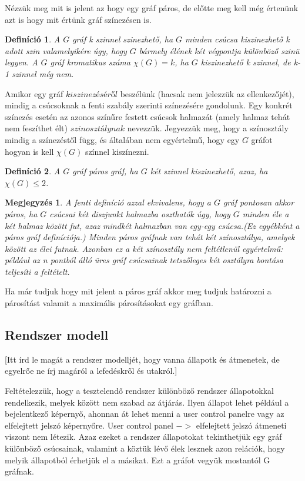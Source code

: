\documentclass[12pt]{article}
\newtheorem{defin}{Definíció}[section]
\newtheorem{megj}{Megjegyzés}[section]
\begin{document}
Nézzük meg mit is jelent az hogy egy gráf páros, de előtte meg kell még értenünk azt is hogy mit értünk gráf színezésen is.

\begin{defin}
A $G$ gráf k szinnel szinezhető, ha $G$ minden csúcsa kiszinezhető k adott szin valamelyikére úgy, hogy $G$ bármely élének két végpontja különböző szinü legyen. A $G$ gráf kromatikus száma $\chi(G) = k$, ha $G$ kiszinezhető k szinnel, de k-1 szinnel még nem. ~\cite{szam:Fleiner}
\end{defin}

Amikor egy gráf $kiszinezéséről$ beszélünk (hacsak nem jelezzük az ellenkezőjét), mindig a csúcsoknak a fenti szabály szerinti színezésére gondolunk. Egy konkrét színezés esetén az azonos színűre festett csúcsok halmazát (amely halmaz tehát nem feszíthet élt) $szinosztálynak$ nevezzük. Jegyezzük meg, hogy a színosztály mindig a színezéstől függ, és általában nem egyértelmű, hogy egy $G$ gráfot hogyan is kell $\chi(G)$ színnel kiszínezni.

\begin{defin}
A $G$ gráf páros gráf, ha $G$ két szinnel kiszinezhető, azaz, ha $\chi(G) \leq 2$. ~\cite{szam:Fleiner}
\end{defin}

\begin{megj}
A fenti definíció azzal ekvivalens, hogy a $G$ gráf pontosan akkor páros, ha $G$ csúcsai két diszjunkt halmazba oszthatók úgy, hogy $G$ minden éle a két halmaz között fut, azaz mindkét halmazban van egy-egy csúcsa.(Ez egyébként a páros gráf definíciója.) Minden páros gráfnak van tehát két színosztálya, amelyek között az élei futnak. Azonban ez a két színosztály nem feltétlenül egyértelmű: például az n pontból álló üres gráf csúcsainak tetszőleges két osztályra bontása teljesíti a feltételt.
\end{megj}

Ha már tudjuk hogy mit jelent a páros gráf akkor meg tudjuk határozni a párosítást valamit a maximális párosításokat egy gráfban.

\subsection{Rendszer modell}
[Itt írd le magát a rendszer modelljét, hogy vanna állapotk és átmenetek, de egyelrőe ne írj magáról a lefedéskről és utakról.]

Feltételezzük, hogy a tesztelendő rendszer különböző rendszer állapotokkal rendelkezik, melyek között nem szabad az átjárás. Ilyen állapot lehet például a bejelentkező képernyő, ahonnan át lehet menni a user control panelre vagy az elfelejtett jelszó képernyőre. User control panel $->$ elfelejtett jelszó átmeneti viszont nem létezik. Azaz ezeket a rendszer állapotokat tekinthetjük egy gráf különböző csúcsainak, valamint a köztük lévő élek lesznek azon relációk, hogy melyik állapotból érhetjük el a másikat. Ezt a gráfot vegyük mostantól G gráfnak.
\end{document}
